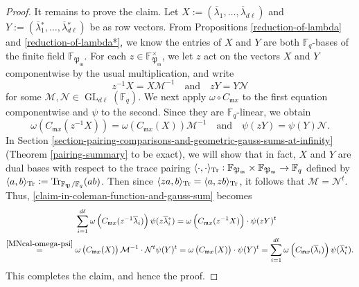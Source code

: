 \documentclass[11pt]{amsart}
\theoremstyle{plain}
\theoremstyle{definition}
\theoremstyle{remark}
\numberwithin{equation}{section}
\newcommand{\FF}{\mathbb{F}}
\newcommand{\mfk}{\mathfrak{m}}
\newcommand{\Pfk}{\mathfrak{P}}
\newcommand{\Mcal}{\mathcal{M}}
\newcommand{\Ncal}{\mathcal{N}}
\newcommand{\GL}{\operatorname{GL}}
\newcommand{\Tr}{\operatorname{Tr}}
\newcommand{\ovl}{\overline}
\newcommand{\Fq}{\FF_q}
\let\l\ell
\DeclarePairedDelimiter{\angtr}{\langle}{\rangle_\textnormal{Tr}}
\begin{document}
\begin{proof}
		It remains to prove the claim.
		Let $X := (\ovl{\lambda}_1, \ldots, \ovl{\lambda}_{d\l})$ and $Y := (\ovl{\lambda}{}^*_1, \ldots, \ovl{\lambda}{}^*_{d\l})$ be as row vectors. 
		From Propositions \ref{reduction-of-lambda} and \ref{reduction-of-lambda*}, we know the entries of $X$ and $Y$ are both $\Fq$-bases of the finite field $\FF_{\Pfk_\mfk}$. 
		For each $z \in \FF_{\Pfk_\mfk}^\times$, we let $z$ act on the vectors $X$ and $Y$ componentwise by the usual multiplication, and write
		$$
		z^{-1}X = X\Mcal^{-1}
		\quad
		\text{and}
		\quad 
		z Y = Y\Ncal
		$$
		for some $\Mcal,\Ncal \in \GL_{d\l}(\Fq)$.
		We next apply $\omega \circ C_{\mfk x}$ to the first equation componentwise and $\psi$ to the second.
		Since they are $\Fq$-linear, we obtain
		\begin{equation}    \label{MNcal-omega-psi}
			\omega\left(C_{\mfk x} (z^{-1}X)\right)
			= \omega\left(C_{\mfk x} (X)\right)  \Mcal^{-1}
			\quad
			\text{and}
			\quad 
			\psi(zY) = \psi(Y) \Ncal.
		\end{equation}
		In Section \ref{section-pairing-comparisons-and-geometric-gauss-sums-at-infinity} (Theorem \ref{pairing-summary} to be exact), we will show that in fact, $X$ and $Y$ are dual bases with respect to the trace pairing $\angtr{\cdot,\cdot}: \FF_{\Pfk_\mfk} \times \FF_{\Pfk_\mfk} \to \Fq$ defined by $\angtr{a,b} := \Tr_{\FF_{\Pfk}/\Fq}(ab)$.
		Then since $\angtr{za,b} = \angtr{a,zb}$, it follows that $\Mcal = \Ncal^t$.
		Thus, \eqref{claim-in-coleman-function-and-gauss-sum} becomes
		\begin{align*}
			&\sum_{i=1}^{d\l} \omega\left(C_{\mfk x} (z^{-1}\ovl{\lambda}_i)\right) \psi(z \ovl{\lambda}{}^*_i)
			= \omega\left(C_{\mfk x} (z^{-1}X)\right) \cdot \psi(zY)^t   \\
			\overset{\eqref{MNcal-omega-psi}}{=}{} &\omega\left(C_{\mfk x} (X)\right)  \Mcal^{-1}
			\cdot \Ncal^t \psi(Y)^t
			= \omega\left(C_{\mfk x} (X)\right) \cdot \psi(Y)^t
			= \sum_{i=1}^{d\l} \omega\left(C_{\mfk x} (\ovl{\lambda}_i)\right) \psi(\ovl{\lambda}{}^*_i).
		\end{align*}
		This completes the claim, and hence the proof.
	\end{proof}
	
\end{document}
